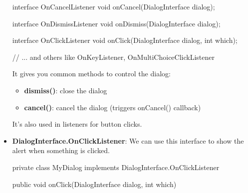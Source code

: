 \documentclass{report}
\begin{document}
\begin{itemize}
\begin{javacode}
{                    interface OnCancelListener {
                        void onCancel(DialogInterface dialog);
                    }

                    interface OnDismissListener {
                        void onDismiss(DialogInterface dialog);
                    }

                    interface OnClickListener {
                        void onClick(DialogInterface dialog, int which);
                    }

                    // ... and others like OnKeyListener, OnMultiChoiceClickListener
                }
            \end{javacode}
            \bigbreak \noindent 
            It gives you common methods to control the dialog:
            \begin{itemize}
                \item \textbf{dismiss()}: close the dialog
                \item \textbf{cancel()}: cancel the dialog (triggers onCancel() callback)
            \end{itemize}
            It’s also used in listeners for button clicks.
        \item \textbf{DialogInterface.OnClickListener}: We can use this interface to show the alert when something is clicked.
            \bigbreak \noindent 
            \begin{javacode}
                private class MyDialog implements DialogInterface.OnClickListener
                {

                    public void onClick(DialogInterface dialog, int which)
                    {
                        
}}
\end{javacode}
\end{itemize}
\end{document}
